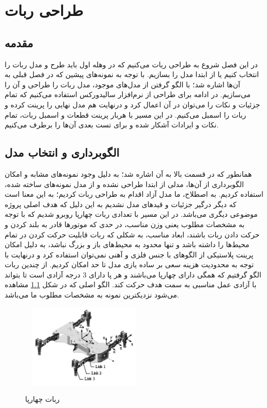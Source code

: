 \chapter{طراحی ربات}

\section{مقدمه}
در این فصل شروع به طراحی ربات می‌کنیم که در وهله اول باید طرح و مدل ربات را انتخاب کنیم یا از ابتدا مدل را بسازیم. با توجه به نمونه‌های پیشین که در فصل قبلی به آن‌ها اشاره شد؛ با الگو گرفتن از مدل‌های موجود، مدل ربات را طراحی و آن را می‌سازیم. 
در ادامه برای طراحی از   نرم‌افزار سالیدورکس 
\unskip{}
استفاده می‌کنیم که تمام جزئیات و نکات را می‌توان در آن اعمال کرد و درنهایت هم مدل نهایی را پرینت کرده و ربات را اسمبل می‌کنیم. در این مسیر با هربار پرینت قطعات و اسمبل ربات، تمام نکات و ایرادات آشکار شده و برای تست بعدی آن‌ها را برطرف می‌کنیم.
\section{الگوبرداری و انتخاب مدل}
همانطور که در قسمت بالا به آن اشاره شد؛ به دلیل وجود نمونه‌های مشابه و امکان الگوبرداری از آن‌ها، مدلی از ابتدا طراحی نشده و از مدل نمونه‌های ساخته شده، استفاده کردیم. به اصطلاح، ما مدل آزاد
\unskip{}
اقدام به طراحی ربات کردیم؛ به این معنا است که دیگر درگیر جزئیات و قیدهای مدل نشدیم به این دلیل که هدف اصلی پروژه موضوعی دیگری می‌باشد. در این مسیر با تعدادی ربات چهارپا روبرو شدیم که با توجه به مشخصات مطلوب یعنی وزن مناسب، در حدی که موتورها قادر به بلند کردن و حرکت دادن ربات باشند، ابعاد مناسب، به شکلی که ربات قابلیت حرکت کردن در تمام محیط‌ها را داشته باشد و تنها محدود به محیط‌های باز و بزرگ نباشد، به دلیل امکان پرینت پلاستیکی از الگوهای با جنس فلزی و آهنی نمی‌توان استفاده کرد و درنهایت با توجه به محدودیت هزینه سعی بر ساده یازی مدل تا حد امکان کردیم. از چندین ربات الگو گرفتیم که همگی دارای چهارپا می‌باشند و هر پا دارای 3 درجه آزادی
\unskip{}
است تا بتواند با آزادی عمل مناسبی به سمت هدف حرکت کند. الگو اصلی که در شکل \ref{ربات چهارپا} مشاهده می‌شود نزدیکترین نمونه به مشخصات مطلوب ما می‌باشد.
    \begin{figure}[!h]	
	\vspace{0.2cm}
	\centering
	\includegraphics[height=4cm,width=6cm]{./Images/CH2/4_Legged_Robot_1.JPG}
	‌\caption[ربات چهارپا]{ربات چهارپا\cite{Sample}}
	\label{ربات چهارپا}
	\end{figure}

